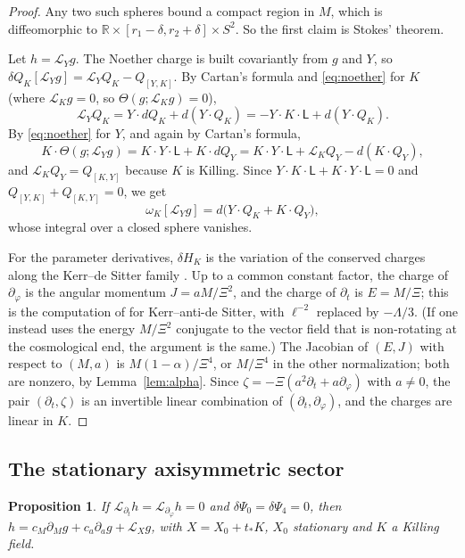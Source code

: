 \documentclass[11pt]{amsart}
\newtheorem{proposition}[theorem]{Proposition}
\theoremstyle{definition}
\theoremstyle{remark}
\numberwithin{equation}{section}
\newcommand{\cL}{\mathcal{L}}
\newcommand{\R}{\mathbb{R}}
\begin{document}
\begin{proof}
Any two such spheres bound a compact region in $M$, which is diffeomorphic to $\R\times[r_1-\delta,r_2+\delta]\times S^2$.
So the first claim is Stokes' theorem.

Let $h=\cL_Yg$. The Noether charge is built covariantly from $g$ and $Y$, so $\delta Q_K[\cL_Yg]=\cL_YQ_K-Q_{[Y,K]}$.
By Cartan's formula and \eqref{eq:noether} for $K$ (where $\cL_Kg=0$, so $\Theta(g;\cL_Kg)=0$),
\[
\cL_YQ_K=Y\cdot dQ_K+d(Y\cdot Q_K)=-Y\cdot K\cdot\mathsf L+d(Y\cdot Q_K).
\]
By \eqref{eq:noether} for $Y$, and again by Cartan's formula,
\[
K\cdot\Theta(g;\cL_Yg)=K\cdot Y\cdot\mathsf L+K\cdot dQ_Y=K\cdot Y\cdot\mathsf L+\cL_KQ_Y-d(K\cdot Q_Y),
\]
and $\cL_KQ_Y=Q_{[K,Y]}$ because $K$ is Killing. Since $Y\cdot K\cdot\mathsf L+K\cdot Y\cdot\mathsf L=0$ and
$Q_{[Y,K]}+Q_{[K,Y]}=0$, we get
\[
\omega_K[\cL_Yg]=d\big(Y\cdot Q_K+K\cdot Q_Y\big),
\]
whose integral over a closed sphere vanishes.

For the parameter derivatives, $\delta H_K$ is the variation of the conserved charges along the Kerr--de Sitter
family \cite{IW94}. Up to a common constant factor, the charge of $\partial_\varphi$ is the angular momentum
$J=aM/\Xi^2$, and the charge of $\partial_t$ is $E=M/\Xi$; this is the computation of \cite{GPP05}
for Kerr--anti-de Sitter, with $\ell^{-2}$ replaced by $-\Lambda/3$. (If one instead uses the energy $M/\Xi^2$ conjugate
to the vector field that is non-rotating at the cosmological end, the argument is the same.) The Jacobian of $(E,J)$ with
respect to $(M,a)$ is $M(1-\alpha)/\Xi^4$, or $M/\Xi^4$ in the other normalization; both are nonzero, by
Lemma~\ref{lem:alpha}. Since
$\zeta=-\Xi(a^2\partial_t+a\partial_\varphi)$ with $a\ne0$, the pair $(\partial_t,\zeta)$ is an invertible linear combination
of $(\partial_t,\partial_\varphi)$, and the charges are linear in $K$.
\end{proof}

\subsection{The stationary axisymmetric sector}
\begin{proposition}\label{prop:stationary}
If $\cL_{\partial_t}h=\cL_{\partial_\varphi}h=0$ and $\delta\Psi_0=\delta\Psi_4=0$, then
$h=c_M\partial_Mg+c_a\partial_ag+\cL_Xg$, with $X=X_0+t_*K$, $X_0$ stationary and $K$ a Killing field.
\end{proposition}
\end{document}
